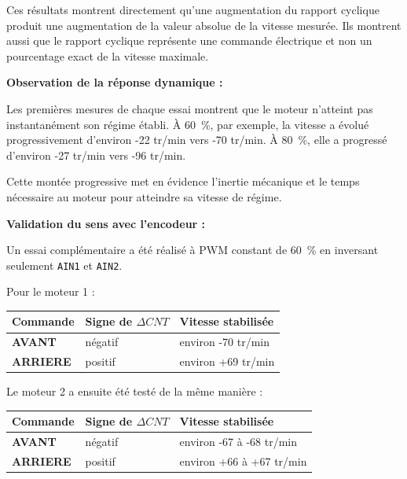 \documentclass[11pt,a4paper]{article}
\begin{document}
\begin{sessionbox}
		Ces résultats montrent directement qu'une augmentation du rapport cyclique produit une augmentation de la valeur absolue de la vitesse mesurée. Ils montrent aussi que le rapport cyclique représente une commande électrique et non un pourcentage exact de la vitesse maximale.
		
		\vspace{0.3cm}
		
		\textbf{Observation de la réponse dynamique :}
		
		Les premières mesures de chaque essai montrent que le moteur n'atteint pas instantanément son régime établi. À 60~\%, par exemple, la vitesse a évolué progressivement d'environ -22 tr/min vers -70 tr/min. À 80~\%, elle a progressé d'environ -27 tr/min vers -96 tr/min.
		
		Cette montée progressive met en évidence l'inertie mécanique et le temps nécessaire au moteur pour atteindre sa vitesse de régime.
		
		\vspace{0.3cm}
		
		\textbf{Validation du sens avec l'encodeur :}
		
		Un essai complémentaire a été réalisé à PWM constant de 60~\% en inversant seulement \texttt{AIN1} et \texttt{AIN2}.
		
		Pour le moteur 1 :
		
		\begin{center}
			\begin{tabular}{>{\bfseries}p{4cm}p{4cm}p{4cm}}
				\toprule
				Commande & Signe de $\Delta CNT$ & Vitesse stabilisée \\
				\midrule
				AVANT & négatif & environ -70 tr/min \\
				ARRIERE & positif & environ +69 tr/min \\
				\bottomrule
			\end{tabular}
		\end{center}
		
		Le moteur 2 a ensuite été testé de la même manière :
		
		\begin{center}
			\begin{tabular}{>{\bfseries}p{4cm}p{4cm}p{4cm}}
				\toprule
				Commande & Signe de $\Delta CNT$ & Vitesse stabilisée \\
				\midrule
				AVANT & négatif & environ -67 à -68 tr/min \\
				ARRIERE & positif & environ +66 à +67 tr/min \\
				\bottomrule
			\end{tabular}
		\end{center}
		

\end{sessionbox}
\end{document}
